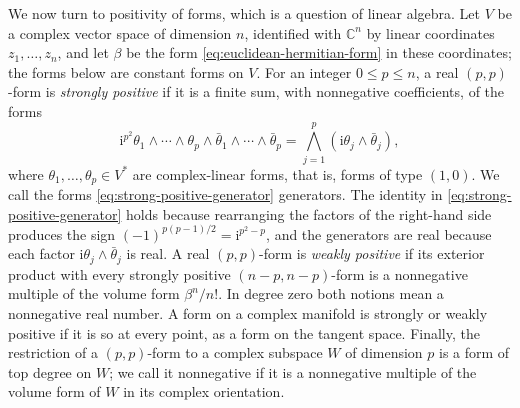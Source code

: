 We now turn to positivity of forms, which is a question of linear algebra. Let $V$ be a complex vector space of dimension $n$, identified with $\mathbb C^n$ by linear coordinates $z_1,\ldots,z_n$, and let $\beta$ be the form \eqref{eq:euclidean-hermitian-form} in these coordinates; the forms below are constant forms on $V$. For an integer $0\leq p\leq n$, a real $(p,p)$-form is \emph{strongly positive} if it is a finite sum, with nonnegative coefficients, of the forms
\begin{equation}\label{eq:strong-positive-generator}
 \mathrm{i}^{p^2}\theta_1\wedge\cdots\wedge\theta_p
 \wedge\bar\theta_1\wedge\cdots\wedge\bar\theta_p
 =\bigwedge_{j=1}^p(\mathrm{i}\theta_j\wedge\bar\theta_j),
\end{equation}
where $\theta_1,\ldots,\theta_p\in V^*$ are complex-linear forms, that is, forms of type $(1,0)$. We call the forms \eqref{eq:strong-positive-generator} generators. The identity in \eqref{eq:strong-positive-generator} holds because rearranging the factors of the right-hand side produces the sign $(-1)^{p(p-1)/2}=\mathrm{i}^{p^2-p}$, and the generators are real because each factor $\mathrm i\theta_j\wedge\bar\theta_j$ is real. A real $(p,p)$-form is \emph{weakly positive} if its exterior product with every strongly positive $(n-p,n-p)$-form is a nonnegative multiple of the volume form $\beta^n/n!$. In degree zero both notions mean a nonnegative real number. A form on a complex manifold is strongly or weakly positive if it is so at every point, as a form on the tangent space. Finally, the restriction of a $(p,p)$-form to a complex subspace $W$ of dimension $p$ is a form of top degree on $W$; we call it nonnegative if it is a nonnegative multiple of the volume form of $W$ in its complex orientation.

